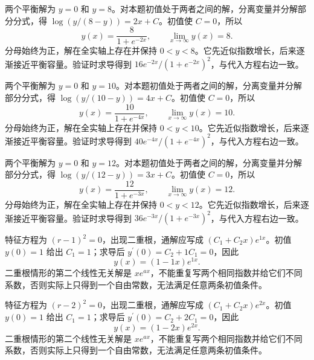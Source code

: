 \documentclass[12pt,fontset=fandol]{ctexart}
\begin{document}
\begin{solve}\label{ans:c23q10}
两个平衡解为 $y=0$ 和 $y=8$。对本题初值处于两者之间的解，分离变量并分解部分分式，得 $\log(y/(8-y))=2x+C$。初值使 $C=0$，所以
\[
y(x)=\frac{8}{1+e^{-2x}},\qquad\lim_{x\to\infty}y(x)=8.
\]
分母始终为正，解在全实轴上存在并保持 $0<y<8$。它先近似指数增长，后来逐渐接近平衡容量。验证时求导得到 $16e^{-2x}/(1+e^{-2x})^2$，与代入方程右边一致。
\end{solve}

\begin{solve}\label{ans:c23q11}
两个平衡解为 $y=0$ 和 $y=10$。对本题初值处于两者之间的解，分离变量并分解部分分式，得 $\log(y/(10-y))=4x+C$。初值使 $C=0$，所以
\[
y(x)=\frac{10}{1+e^{-4x}},\qquad\lim_{x\to\infty}y(x)=10.
\]
分母始终为正，解在全实轴上存在并保持 $0<y<10$。它先近似指数增长，后来逐渐接近平衡容量。验证时求导得到 $40e^{-4x}/(1+e^{-4x})^2$，与代入方程右边一致。
\end{solve}

\begin{solve}\label{ans:c23q12}
两个平衡解为 $y=0$ 和 $y=12$。对本题初值处于两者之间的解，分离变量并分解部分分式，得 $\log(y/(12-y))=3x+C$。初值使 $C=0$，所以
\[
y(x)=\frac{12}{1+e^{-3x}},\qquad\lim_{x\to\infty}y(x)=12.
\]
分母始终为正，解在全实轴上存在并保持 $0<y<12$。它先近似指数增长，后来逐渐接近平衡容量。验证时求导得到 $36e^{-3x}/(1+e^{-3x})^2$，与代入方程右边一致。
\end{solve}

\begin{solve}\label{ans:c23q13}
特征方程为 $(r-1)^2=0$，出现二重根，通解应写成 $(C_1+C_2x)e^{1x}$。初值 $y(0)=1$ 给出 $C_1=1$；求导后 $y^{\prime}(0)=C_2+1C_1=0$，因此
\[
y(x)=(1-1x)e^{1x}.
\]
二重根情形的第二个线性无关解是 $xe^{ax}$，不能重复写两个相同指数并给它们不同系数，否则实际上只得到一个自由常数，无法满足任意两条初值条件。
\end{solve}

\begin{solve}\label{ans:c23q14}
特征方程为 $(r-2)^2=0$，出现二重根，通解应写成 $(C_1+C_2x)e^{2x}$。初值 $y(0)=1$ 给出 $C_1=1$；求导后 $y^{\prime}(0)=C_2+2C_1=0$，因此
\[
y(x)=(1-2x)e^{2x}.
\]
二重根情形的第二个线性无关解是 $xe^{ax}$，不能重复写两个相同指数并给它们不同系数，否则实际上只得到一个自由常数，无法满足任意两条初值条件。
\end{solve}
\end{document}
